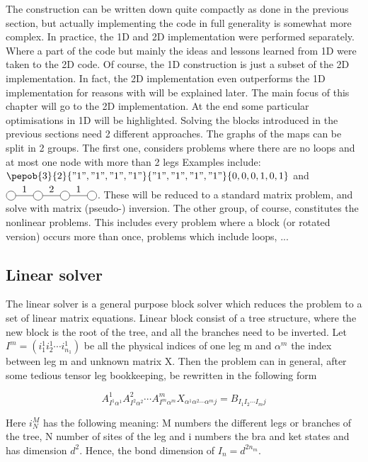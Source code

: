 The construction can be written down quite compactly as done in the previous section, but actually implementing the code in full generality is somewhat more complex. In practice, the 1D and 2D implementation were performed separately. Where a part of the code but mainly the ideas and lessons learned from 1D were taken to the 2D code.
Of course, the 1D construction is just a subset of the 2D implementation. In fact, the 2D implementation even outperforms the 1D implementation for reasons with will be explained later. The main focus of this chapter will go to the 2D implementation. At the end some particular optimisations in 1D will be highlighted.
Solving the blocks introduced in the previous sections need 2 different approaches. The graphs of the maps can be split in 2 groups. The first one, considers problems where there are no loops and at most one node with more than 2 legs Examples include:
$\pepob{3}{2}{{"1","1","1","1"}}{{"1","1","1","1"}}{{0,0,0,1,0,1}}$ and $\mpob{4}{ {,"1","2","1",}  }{}{}{}{{,,,,,}}$.
These will be reduced to a standard matrix problem, and solve with matrix (pseudo-) inversion.
The other group, of course, constitutes the nonlinear problems. This includes every problem where a block (or rotated version) occurs more than once, problems which include loops, ...

\subsection{Linear solver} \label{subsec:linear_solver}

The linear solver is a general purpose block solver which reduces the problem to a set of linear matrix equations. Linear block consist of a tree structure, where the new block is the root of the tree, and all the branches need to be inverted.  Let $ I^m = (i^1_1 i^1_2 \cdots i^1_{n_1})$ be all the physical indices of one leg m and $\alpha^m$ the index between leg m and unknown matrix X. Then the problem can in general, after some tedious tensor leg bookkeeping, be rewritten in the following form

\begin{equation}\label{axb}
    A^1_{ I^1 \alpha^1 }   A^2_{ I^2 \alpha^2 }  \cdots  A^m_{ I^m \alpha^m }   X_{ \alpha^1  \alpha^2  \cdots \alpha^m j }  =  B_{  I_1  I_2 \cdots I_m   j }
\end{equation}

Here $i^M_N$ has the following meaning: M numbers the different legs or branches of the tree, N number of sites of the leg and i numbers the bra and ket states and has dimension $d^2$. Hence, the bond dimension of $I_n= d^{2 n_m }$.

